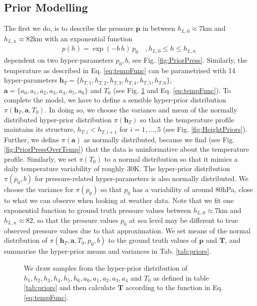 \subsection{Prior Modelling}
The first we do, is to describe the pressure $\bm{p}$ in between $h_{L,0} \approx 7$km and $h_{L,n} \approx 82$km with an exponential function
\begin{align}
	p(h) =
	\exp \left( -b \, h \right)   \,  p_0 \quad , \text{$h_{L,0}  \leq h \leq h_{L,n}$}
	\label{eq:pressFunc}
\end{align}
dependent on two hyper-parameters $p_0,b$, see Fig. \ref{fig:PriorPress}.
Similarly, the temperature as described in Eq. \ref{eq:tempFunc} can be parametrised with 14 hyper-parameters  $\bm{h}_T = \{ h_{T,1}, h_{T,2},h_{T,3},h_{T,4},h_{T,5},h_{T,6} \}$, $\bm{a} = \{a_0, a_1, a_2,a_3,a_4,a_5,a_6 \} $ and $T_0$ (see Fig. \ref{fig:PriorTemp} and Eq. \ref{eq:tempFunc}).
To complete the model, we have to define a sensible hyper-prior distribution $\pi(\bm{h}_T, \bm{a}, T_0)$.
In doing so, we choose the variance and mean of the normally distributed hyper-prior distribution $\pi(\bm{h}_T)$ so that the temperature profile maintains its structure, $ h_{T, i} < h_{T, i+1}$ for $i = 1,\dots, 5$ (see Fig. \ref{fig:HeightPriors}).
Further, we define $\pi(\bm{a})$ as normally distributed, because we find (see Fig. \ref{fig:PriorPressOverTemp}) that the data is uninformative about the temperature profile.
Similarly, we set $\pi(T_0)$ to a normal distribution so that it mimics a daily temperature variability of roughly 30K.
The hyper-prior distribution $\pi(p_0, b)$ for pressure-related hyper-parameters is also normally distributed.
We choose the variance for $\pi(p_0)$ so that $p_0$ has a variability of around 80hPa, close to what we can observe when looking at weather data.
Note that we fit one exponential function to ground truth pressure values between $h_{L,0} \approx 7$km and $h_{L,n} \approx 82$, so that the pressure values $p_0$ at sea level may be different to true observed pressure values due to that approximation.
We set means of the normal distribution of $\pi(\bm{h}_T,\bm{a}, T_0, p_0, b)$ to the ground truth values of $\bm{p}$ and $\bm{T}$, and summarise the hyper-prior means and variances in Tab. \ref{tab:priors}.
\begin{figure}[ht!]
	\centering
	
	\caption[Prior Samples of $\bm{T}$ according to the respective hyper-prior distribution.]{We draw samples from the hyper-prior distribution of $h_1, h_2,h_3,h_4,h_5,h_6, a_0, a_1, a_2,a_3,a_4$ and $T_0$ as defined in table \ref{tab:priors} and then calculate $\bm{T}$ according to the function in Eq. \ref{eq:tempFunc}.}
	\label{fig:PriorTemp}
\end{figure}

